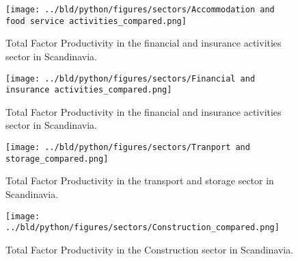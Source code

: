 \documentclass[11pt, a4paper, leqno]{article}
\begin{document}
\begin{figure}[H]

    \centering
    \texttt{[image: ../bld/python/figures/sectors/Accommodation and food service activities\_compared.png]}

    \caption{Total Factor Productivity in the financial and insurance activities sector in Scandinavia.}
    \label{fig:python-predictions}

\end{figure}

\begin{figure}[H]

    \centering
    \texttt{[image: ../bld/python/figures/sectors/Financial and insurance activities\_compared.png]}

    \caption{Total Factor Productivity in the financial and insurance activities sector in Scandinavia.}
    \label{fig:python-predictions}

\end{figure}

\begin{figure}[H]

    \centering
    \texttt{[image: ../bld/python/figures/sectors/Tranport and storage\_compared.png]}

    \caption{Total Factor Productivity in the transport and storage sector in Scandinavia.}
    \label{fig:python-predictions}

\end{figure}

\begin{figure}[H]

    \centering
    \texttt{[image: ../bld/python/figures/sectors/Construction\_compared.png]}

    \caption{Total Factor Productivity in the Construction sector in Scandinavia.}
    \label{fig:python-predictions}

\end{figure}
\end{document}
